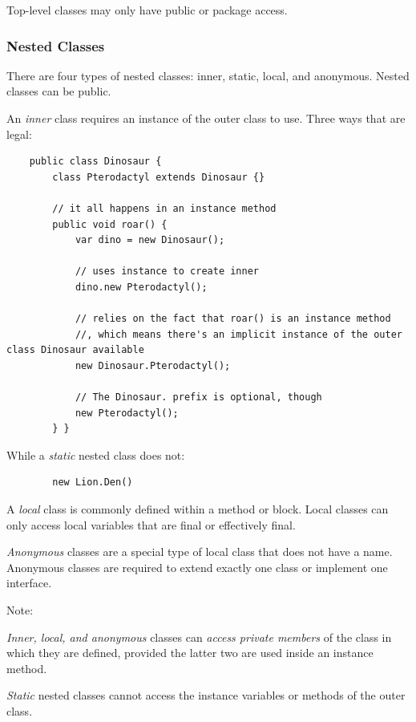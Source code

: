 \documentclass{scrartcl}
\begin{document}
Top-level classes may only have public or
package access.

\subsubsection{Nested Classes}

    There are four types of nested classes: inner, static, local, and anonymous.
    Nested classes can be public.

    An \textit{inner} class requires an instance of the outer class to use.
    Three ways that are legal:

    \begin{lstlisting}
    public class Dinosaur {
        class Pterodactyl extends Dinosaur {}

        // it all happens in an instance method
        public void roar() {
            var dino = new Dinosaur();

            // uses instance to create inner
            dino.new Pterodactyl();

            // relies on the fact that roar() is an instance method
            //, which means there's an implicit instance of the outer class Dinosaur available
            new Dinosaur.Pterodactyl();

            // The Dinosaur. prefix is optional, though
            new Pterodactyl();
        } }
    \end{lstlisting}

    While a \textit{static} nested class does not:

    \begin{lstlisting}
        new Lion.Den()
    \end{lstlisting}

    A \textit{local} class is commonly defined within a method or block.
    Local classes can only access local variables that are final or effectively final.

    \textit{Anonymous} classes are a special type of local class that does not have a name.
    Anonymous classes are required to extend exactly one class or implement one interface.

    Note:

    \textit{Inner, local, and anonymous} classes can \textit{access private members} of the class in which they are defined, provided the latter two are used inside an instance method.

    \textit{Static} nested classes cannot access the instance variables or methods of the outer class.
\end{document}
